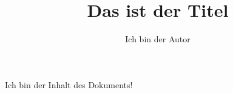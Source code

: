 \documentclass[a4paper]{scrartcl}
\title{Das ist der Titel}
\author{Ich bin der Autor}
\begin{document}
	Ich bin der Inhalt des Dokuments!
\end{document}
